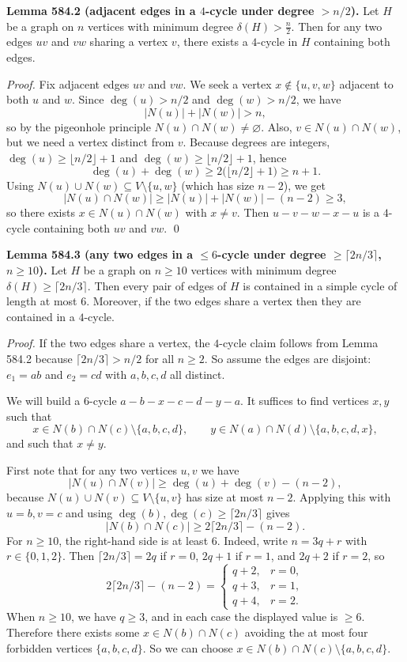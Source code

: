 \bigskip
\noindent\textbf{Lemma 584.2 (adjacent edges in a $4$-cycle under degree $>n/2$).}
Let $H$ be a graph on $n$ vertices with minimum degree $\delta(H)>\frac n2$.
Then for any two edges $uv$ and $vw$ sharing a vertex $v$, there exists a $4$-cycle in $H$ containing both edges.

\noindent\emph{Proof.}
Fix adjacent edges $uv$ and $vw$.
We seek a vertex $x\notin\{u,v,w\}$ adjacent to both $u$ and $w$.
Since $\deg(u)>n/2$ and $\deg(w)>n/2$, we have
\[
|N(u)|+|N(w)|>n,
\]
so by the pigeonhole principle $N(u)\cap N(w)\neq\varnothing$.
Also, $v\in N(u)\cap N(w)$, but we need a vertex distinct from $v$.
Because degrees are integers, $\deg(u)\ge\lfloor n/2\rfloor+1$ and $\deg(w)\ge\lfloor n/2\rfloor+1$, hence
\[\deg(u)+\deg(w)\ge 2\bigl(\lfloor n/2\rfloor+1\bigr)\ge n+1.\]
Using $N(u)\cup N(w)\subseteq V\setminus\{u,w\}$ (which has size $n-2$), we get
\[
|N(u)\cap N(w)|\ge |N(u)|+|N(w)|-(n-2)\ge 3,
\]
so there exists $x\in N(u)\cap N(w)$ with $x\ne v$.
Then $u-v-w-x-u$ is a $4$-cycle containing both $uv$ and $vw$.
\qed

\bigskip
\noindent\textbf{Lemma 584.3 (any two edges in a $\le 6$-cycle under degree $\ge\lceil 2n/3\rceil$, $n\ge 10$).}
Let $H$ be a graph on $n\ge 10$ vertices with minimum degree $\delta(H)\ge \lceil 2n/3\rceil$.
Then every pair of edges of $H$ is contained in a simple cycle of length at most $6$.
Moreover, if the two edges share a vertex then they are contained in a $4$-cycle.

\noindent\emph{Proof.}
If the two edges share a vertex, the $4$-cycle claim follows from Lemma 584.2 because $\lceil 2n/3\rceil>n/2$ for all $n\ge 2$.
So assume the edges are disjoint: $e_1=ab$ and $e_2=cd$ with $a,b,c,d$ all distinct.

We will build a $6$-cycle $a-b-x-c-d-y-a$.
It suffices to find vertices $x,y$ such that
\[
 x\in N(b)\cap N(c)\setminus\{a,b,c,d\},\qquad
 y\in N(a)\cap N(d)\setminus\{a,b,c,d,x\},
\]
and such that $x\ne y$.

First note that for any two vertices $u,v$ we have
\[
|N(u)\cap N(v)|\ge \deg(u)+\deg(v)-(n-2),
\]
because $N(u)\cup N(v)\subseteq V\setminus\{u,v\}$ has size at most $n-2$.
Applying this with $u=b,v=c$ and using $\deg(b),\deg(c)\ge\lceil 2n/3\rceil$ gives
\[
|N(b)\cap N(c)|\ge 2\lceil 2n/3\rceil-(n-2).
\]
For $n\ge 10$, the right-hand side is at least $6$. Indeed, write $n=3q+r$ with $r\in\{0,1,2\}$.
Then $\lceil 2n/3\rceil=2q$ if $r=0$, $2q+1$ if $r=1$, and $2q+2$ if $r=2$, so
\[
2\lceil 2n/3\rceil-(n-2)=\begin{cases}
q+2,&r=0,\\
q+3,&r=1,\\
q+4,&r=2.
\end{cases}
\]
When $n\ge 10$, we have $q\ge 3$, and in each case the displayed value is $\ge 6$.
Therefore there exists some $x\in N(b)\cap N(c)$ avoiding the at most four forbidden vertices $\{a,b,c,d\}$.
So we can choose $x\in N(b)\cap N(c)\setminus\{a,b,c,d\}$.

